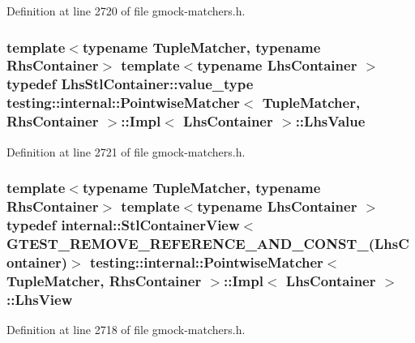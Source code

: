 Definition at line 2720 of file gmock-\/matchers.\+h.

\subsubsection[{\texorpdfstring{Lhs\+Value}{LhsValue}}]{\setlength{\rightskip}{0pt plus 5cm}template$<$typename Tuple\+Matcher, typename Rhs\+Container$>$ template$<$typename Lhs\+Container $>$ typedef Lhs\+Stl\+Container\+::value\+\_\+type {\bf testing\+::internal\+::\+Pointwise\+Matcher}$<$ Tuple\+Matcher, Rhs\+Container $>$\+::{\bf Impl}$<$ Lhs\+Container $>$\+::{\bf Lhs\+Value}}\hypertarget{classtesting_1_1internal_1_1_pointwise_matcher_1_1_impl_a453769e721f4212e399f76c980b4b65c}{}\label{classtesting_1_1internal_1_1_pointwise_matcher_1_1_impl_a453769e721f4212e399f76c980b4b65c}


Definition at line 2721 of file gmock-\/matchers.\+h.

\subsubsection[{\texorpdfstring{Lhs\+View}{LhsView}}]{\setlength{\rightskip}{0pt plus 5cm}template$<$typename Tuple\+Matcher, typename Rhs\+Container$>$ template$<$typename Lhs\+Container $>$ typedef {\bf internal\+::\+Stl\+Container\+View}$<$ {\bf G\+T\+E\+S\+T\+\_\+\+R\+E\+M\+O\+V\+E\+\_\+\+R\+E\+F\+E\+R\+E\+N\+C\+E\+\_\+\+A\+N\+D\+\_\+\+C\+O\+N\+S\+T\+\_\+}(Lhs\+Container)$>$ {\bf testing\+::internal\+::\+Pointwise\+Matcher}$<$ Tuple\+Matcher, Rhs\+Container $>$\+::{\bf Impl}$<$ Lhs\+Container $>$\+::{\bf Lhs\+View}}\hypertarget{classtesting_1_1internal_1_1_pointwise_matcher_1_1_impl_a5240abc710bb0a5bedfd180bf6701fae}{}\label{classtesting_1_1internal_1_1_pointwise_matcher_1_1_impl_a5240abc710bb0a5bedfd180bf6701fae}


Definition at line 2718 of file gmock-\/matchers.\+h.



